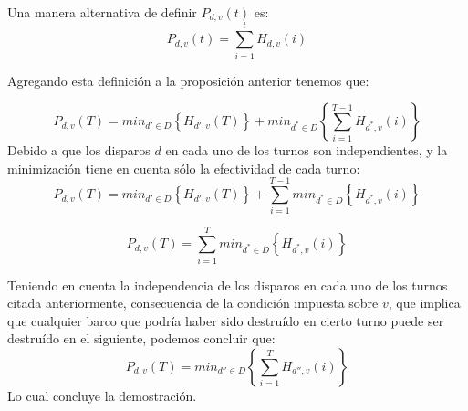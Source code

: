 \documentclass{article}
\begin{document}
Una manera alternativa de definir $P_{d,v}(t)$ es:$$P_{d,v}(t)=\sum_{i=1}^{t} H_{d,v}(i)$$

Agregando esta definición a la proposición anterior tenemos que:

$$P_{d,v}(T)=min_{d' \in D} \left \{ H_{d',v}(T) \right \}+min_{d^* \in D}\left \{ \sum_{i=1}^{T-1} H_{d^*,v}(i) \right \}$$
Debido a que los disparos $d$ en cada uno de los turnos son independientes, y la minimización tiene en cuenta sólo la efectividad de cada turno:
$$P_{d,v}(T)=min_{d' \in D} \left \{ H_{d',v}(T) \right \}+\sum_{i=1}^{T-1} min_{d^* \in D}\left \{  H_{d^*,v}(i) \right \}$$

$$P_{d,v}(T)=\sum_{i=1}^{T} min_{d^* \in D}\left \{  H_{d^*,v}(i) \right \}$$

Teniendo en cuenta la independencia de los disparos en cada uno de los turnos citada anteriormente, consecuencia de la condición impuesta sobre $v$, que implica que cualquier barco que podría haber sido destruído en cierto turno puede ser destruído en el siguiente, podemos concluir que:
$$P_{d,v}(T)=min_{d'' \in D}\left \{ \sum_{i=1}^{T} H_{d'',v}(i) \right \}$$
Lo cual concluye la demostración.
\end{document}
